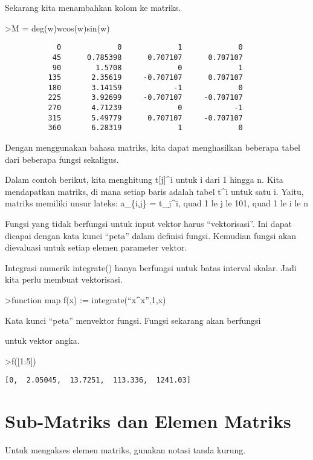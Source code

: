 \documentclass[
]{book}
\begin{document}
Sekarang kita menambahkan kolom ke matriks.

\textgreater M = deg(w)\textbar w\textbar cos(w)\textbar sin(w)

\begin{verbatim}
            0             0             1             0 
           45      0.785398      0.707107      0.707107 
           90        1.5708             0             1 
          135       2.35619     -0.707107      0.707107 
          180       3.14159            -1             0 
          225       3.92699     -0.707107     -0.707107 
          270       4.71239             0            -1 
          315       5.49779      0.707107     -0.707107 
          360       6.28319             1             0 
\end{verbatim}

Dengan menggunakan bahasa matriks, kita dapat menghasilkan beberapa tabel dari beberapa fungsi sekaligus.

Dalam contoh berikut, kita menghitung t{[}j{]}\^{}i untuk i dari 1 hingga n. Kita mendapatkan matriks, di mana setiap baris adalah tabel t\^{}i untuk satu i. Yaitu, matriks memiliki unsur lateks: a\_\{i,j\} = t\_j\^{}i, quad 1 le j le 101, quad 1 le i le n

Fungsi yang tidak berfungsi untuk input vektor harus ``vektorisasi''. Ini dapat dicapai dengan kata kunci ``peta'' dalam definisi fungsi. Kemudian fungsi akan dievaluasi untuk setiap elemen parameter vektor.

Integrasi numerik integrate() hanya berfungsi untuk batas interval skalar. Jadi kita perlu membuat vektorisasi.

\textgreater function map f(x) := integrate(``x\^{}x'',1,x)

Kata kunci ``peta'' menvektor fungsi. Fungsi sekarang akan berfungsi

untuk vektor angka.

\textgreater f({[}1:5{]})

\begin{verbatim}
[0,  2.05045,  13.7251,  113.336,  1241.03]
\end{verbatim}

\chapter{Sub-Matriks dan Elemen Matriks}\label{sub-matriks-dan-elemen-matriks}

Untuk mengakses elemen matriks, gunakan notasi tanda kurung.
\end{document}
